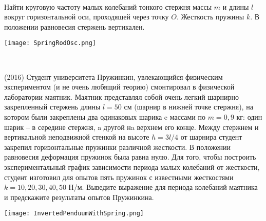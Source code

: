 \begin{ex}
\hspace{0pt} \\
\begin{minipage}{.65\textwidth} 
Найти круговую частоту малых колебаний тонкого стержня массы $m$ и длины $l$ вокруг горизонтальной оси, проходящей через точку $O$. 
Жесткость пружины $k$. В положении равновесия стержень вертикален.
\end{minipage}
\begin{minipage}{.35\textwidth}
\centering
\texttt{[image: SpringRodOsc.png]}
\end{minipage}
\begin{ans}
\end{ans}
\end{ex}

\begin{ex}
\hspace{0pt} \\
\begin{minipage}{.65\textwidth}
(2016) Студент университета Пружинкин, увлекающийся физическим экспериментом (и не очень любящий теорию) смонтировал в физической лаборатории маятник. Маятник представлял собой очень легкий шарнирно закрепленный стержень длины $l = 50$ см (шарнир в нижней точке стержня), на котором были закреплены два одинаковых шарика c массами по $m = 0,9$ кг: один шарик -- в середине стержня, a другой нa верхнем его конце. Между стержнем и вертикальной неподвижной стенкой на высоте $h=3l/4$ от шарнира студент закрепил горизонтальные пружинки различной жесткости. В положении равновесия деформация пружинок была равна нулю. Для того, чтобы построить экспериментальный график зависимости периода малых колебаний от жесткости, студент изготовил для опытов пять пружинок с известными жесткостями $k = 10, 20, 30, 40, 50$ Н/м. Выведите выражение для периода колебаний маятника и предскажите результаты опытов Пружинкина.
\end{minipage}
\begin{minipage}{.35\textwidth}
\centering
\texttt{[image: InvertedPenduumWithSpring.png]}
\end{minipage}
\begin{ans}
\end{ans}
\end{ex}

